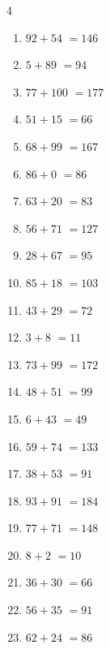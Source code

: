 \begin{multicols}{4}
\begin{enumerate}
  \item $92+54$
        $=146$

  \item $5+89$
        $=94$

  \item $77+100$
        $=177$

  \item $51+15$
        $=66$

  \item $68+99$
        $=167$

  \item $86+0$
        $=86$

  \item $63+20$
        $=83$

  \item $56+71$
        $=127$

  \item $28+67$
        $=95$

  \item $85+18$
        $=103$

  \item $43+29$
        $=72$

  \item $3+8$
        $=11$

  \item $73+99$
        $=172$

  \item $48+51$
        $=99$

  \item $6+43$
        $=49$

  \item $59+74$
        $=133$

  \item $38+53$
        $=91$

  \item $93+91$
        $=184$

  \item $77+71$
        $=148$

  \item $8+2$
        $=10$

  \item $36+30$
        $=66$

  \item $56+35$
        $=91$

\columnbreak %

  \item $62+24$
        $=86$


\end{enumerate}
\end{multicols}
